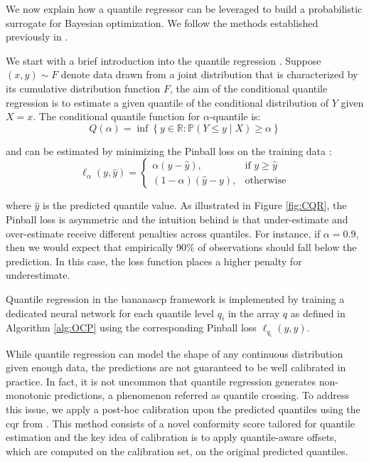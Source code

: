 \documentclass[a4paper,oneside,bibliography=totoc]{scrbook}
\begin{document}
{\begin{description}[leftmargin=0cm]
	\item [Quantile Regressor] We now explain how a quantile regressor can be leveraged to build a probabilistic surrogate for Bayesian optimization. We follow the methods established previously in \cite{romano2019conformalized, salinas2023optimizing}.
	
	
	We start with a brief introduction into the quantile regression \cite{koenker1978regression}. Suppose $(x, y) \sim F$ denote data drawn from a joint distribution that is characterized by its cumulative distribution function $F$, the aim of the conditional quantile regression is to estimate a given quantile of the conditional distribution of $Y$ given $X=x$. The conditional quantile function for $\alpha$-quantile is:
		\begin{equation}
			Q(\alpha) = \inf \left\{ y \in \mathbb{R} : \mathbb{P}(Y \leq y \mid X) \geq \alpha \right\}
		\label{quantilefunc}
		\end{equation}
		
	and can be estimated by minimizing the Pinball loss on the training data \cite{koenker1978regression}:
		\begin{equation}
			\ell_\alpha(y, \hat{y}) = 
			\begin{cases}
			\alpha (y - \hat{y}), & \text{if } y \geq \hat{y} \\
			(1 - \alpha)(\hat{y} - y), & \text{otherwise}
			\end{cases}
		\label{pinballloss}
		\end{equation}
		
	where $\hat{y}$ is the predicted quantile value.	 As illustrated in Figure \ref{fig:CQR}, the Pinball loss is asymmetric and the intuition behind is that under-estimate and over-estimate receive different penalties across quantiles. 	For instance, if $\alpha=0.9$, then we would expect that empirically 90\% of observations should fall below the prediction. In this case, the loss function places a higher penalty for underestimate.	
	
	Quantile regression in the \gls{bananascp} framework is implemented by training a dedicated neural network for each quantile level $q_i$ in the array $q$ as defined in Algorithm \ref{alg:OCP} using the corresponding Pinball loss $\ell_{q_i}(y, \hat{y})$.
	
	 While quantile regression can model the shape of any continuous distribution given enough data, the predictions are not guaranteed to be well calibrated in practice. In fact, it is not uncommon that quantile regression generates non-monotonic predictions, a phenomenon referred as quantile crossing. To address this issue, we apply a post-hoc calibration upon the predicted quantiles using the \gls{cqr} from \cite{romano2019conformalized}. This method consists of a novel conformity score tailored for quantile estimation and the key idea of calibration is to apply quantile-aware offsets, which are computed on the calibration set, on the original predicted quantiles. 
		 

\end{description}}
\end{document}
